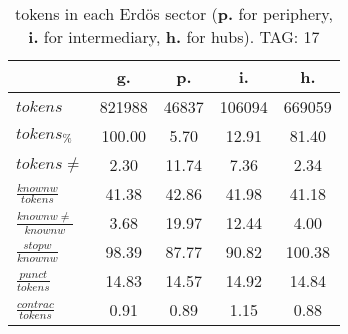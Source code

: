 \begin{table}[h!]
\begin{center}
\begin{tabular}{| l || c | c | c | c |}\hline
 & {\bf g.} & {\bf p.} & {\bf i.} & {\bf h.} \\\hline\hline
$tokens$ & 821988  & 46837  & 106094  & 669059 \\
$tokens_{\%}$ & 100.00  & 5.70  & 12.91  & 81.40 \\
$tokens \neq$ & 2.30  & 11.74  & 7.36  & 2.34 \\\hline
$\frac{knownw}{tokens}$ & 41.38  & 42.86  & 41.98  & 41.18 \\
$\frac{knownw \neq}{knownw}$ & 3.68  & 19.97  & 12.44  & 4.00 \\\hline
$\frac{stopw}{knownw}$ & 98.39  & 87.77  & 90.82  & 100.38 \\
$\frac{punct}{tokens}$ & 14.83  & 14.57  & 14.92  & 14.84 \\
$\frac{contrac}{tokens}$ & 0.91  & 0.89  & 1.15  & 0.88 \\\hline
\end{tabular}
\caption{tokens in each Erd\"os sector ({{\bf p.}} for periphery, {{\bf i.}} for intermediary, 
    {{\bf h.}} for hubs). TAG: 17}
\end{center}
\end{table}